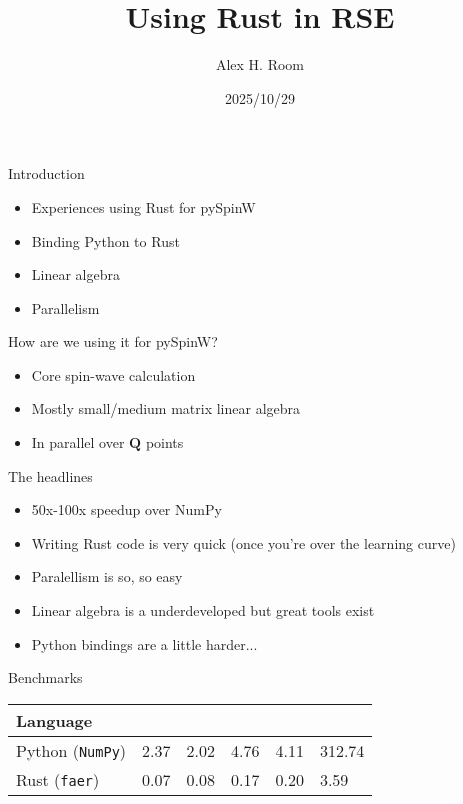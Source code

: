 \documentclass{beamer}
\title{Using Rust in RSE}
\author{Alex H. Room}
\date{2025/10/29}
\begin{document}
\begin{frame}
\titlepage
\end{frame}

\begin{frame}{Introduction}
  \begin{itemize}
    \item Experiences using Rust for pySpinW
    \item Binding Python to Rust
    \item Linear algebra
    \item Parallelism
  \end{itemize}
\end{frame}

\begin{frame}{How are we using it for pySpinW?}
  \begin{itemize}
    \item Core spin-wave calculation
    \item Mostly small/medium matrix linear algebra
    \item In parallel over $\mathbf{Q}$ points
  \end{itemize}
\end{frame}

\begin{frame}{The headlines}
  \begin{itemize}
    \item 50x-100x speedup over NumPy
    \item Writing Rust code is very quick (once you're over the learning curve)
    \item Paralellism is so, so easy
    \item Linear algebra is a underdeveloped but great tools exist
    \item Python bindings are a little harder...
  \end{itemize}
\end{frame}

\begin{frame}{Benchmarks}
  \begin{tabular}{l l l l l l}
    Language & & & & & \\
    \hline\hline
    Python (\texttt{NumPy}) & 2.37 & 2.02 & 4.76 & 4.11 & 312.74 \\
    Rust (\texttt{faer}) & 0.07 & 0.08 & 0.17 & 0.20 & 3.59 \\
  \end{tabular}
\end{frame}
\end{document}
